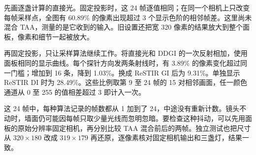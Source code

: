 先画逐盏计算的直接光。固定投影时，这 24 帧逐值相同；在同一个相机上只改变每帧采样点，全图有 60.89\% 的像素出现超过 3 个显示色阶的相邻帧差。这里尚未混合 TAA，测量的是它收到的输入。旧设置还把宽 320 像素的结果放大到整个面板，像素和细节一起被放大。

再固定投影，只让采样算法继续工作。将直接光和 DDGI 的一次反射相加，使用面板相同的显示曲线。每个探针方向发两条射线时，有 3.89\% 的像素变化超过同一门槛；增加到 16 条，降到 1.03\%。换成 ReSTIR GI 后为 9.31\%。单独显示 ReSTIR DI 时为 28.49\%。这些比例取第 9 至 24 帧的 15 对相邻画面，任一颜色通道从 0 至 255 的值相差超过 3 即计入一次。

这 24 帧中，每种算法记录的帧数都从 1 加到了 24，中途没有重新计数。镜头不动时，墙面仍可能因每帧只取少量光线而忽明忽暗。要检查这种抖动，可以先用面板的原始分辨率固定相机，再分别比较 TAA 混合前后的两帧。独立测试也把尺寸从 $320\times180$ 改成 $319\times179$ 再还原，逐像素核对固定相机输出和三盏灯，结果一致。

